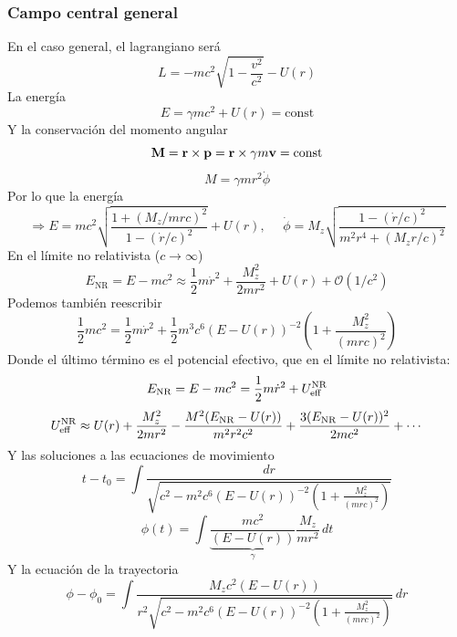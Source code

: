\documentclass[]{article}
\numberwithin{equation}{section}
\begin{document}
\subsubsection{Campo central general}
En el caso general, el lagrangiano será
\begin{equation*}
	L = -mc^2 \sqrt{1 - \frac{v^2}{c^2}} - U(r)
\end{equation*}
La energía
\begin{equation*}
	E = \gamma mc^2 + U(r) = \mathrm{const}
\end{equation*}
Y la conservación del momento angular
\begin{equation*}
	\mathbf{M} = \mathbf{r}\times\mathbf{p} = \mathbf{r}\times\gamma m \mathbf{v} = \mathrm{const}
\end{equation*}
\begin{equation*}
	M = \gamma m r^2 \dot{\phi}
\end{equation*}
Por lo que la energía
\begin{equation*}
	\Rightarrow E = mc^2 \sqrt{\frac{1 + (M_z/m r c)^2}{1 - (\dot{r}/c)^2}} + U(r), ~~~~~~ \dot{\phi} = M_z \sqrt{\frac{1 - (\dot{r}/c)^2}{m^2 r^4 + (M_z r/c)^2}}
\end{equation*}
En el límite no relativista (\(c\rightarrow\infty\))
\begin{equation*}
	E_{\mathrm{NR}} = E - mc^2 \approx \frac{1}{2}m\dot{r}^2 + \frac{M_z^2}{2 m r^2} + U(r) + \mathcal{O}(1/c^2)
\end{equation*}
Podemos también reescribir
\begin{equation*}
	\frac{1}{2} m c^2 = \frac{1}{2} m \dot{r}^2 + \frac{1}{2} m^3 c^6 \left(E - U(r)\right)^{-2} \left(1 + \frac{M_{z}^2}{(m r c)^2}\right)
\end{equation*}
Donde el último término es el potencial efectivo, que en el límite no relativista:
\begin{equation*}
	E_{\mathrm{NR}} = E - mc^2 = \frac{1}{2}m \dot{r}^2 + U_\mathrm{eff}^{\mathrm{NR}}
\end{equation*}
\begin{equation}
	U_\mathrm{eff}^{\mathrm{NR}} \approx U(r) + \frac{M_z^2}{2 m r^2} - \frac{M^2 (E_{\mathrm{NR}} - U(r))}{m^2 r^2 c^2} + \frac{3 (E_{\mathrm{NR}} - U(r))^2}{2 m c^2} + \cdots
\end{equation}
Y las soluciones a las ecuaciones de movimiento
\begin{equation*}
	t - t_0 = \int \frac{dr}{\sqrt{c^2 - m^2 c^6 \left(E - U(r)\right)^{-2} \left(1 + \frac{M_{z}^2}{(m r c)^2}\right)}}
\end{equation*}
\begin{equation*}
	\phi(t) = \int \underbrace{\frac{mc^2}{(E - U(r))}}_{\gamma} \frac{M_z}{mr^2} \, dt
\end{equation*}
Y la ecuación de la trayectoria
\begin{equation*}
	\phi - \phi_0 = \int \frac{M_z c^2 (E - U(r))}{r^2 \sqrt{c^2 - m^2 c^6 \left(E - U(r)\right)^{-2} \left(1 + \frac{M_{z}^2}{(m r c)^2}\right)}} \, dr
\end{equation*}
\end{document}
